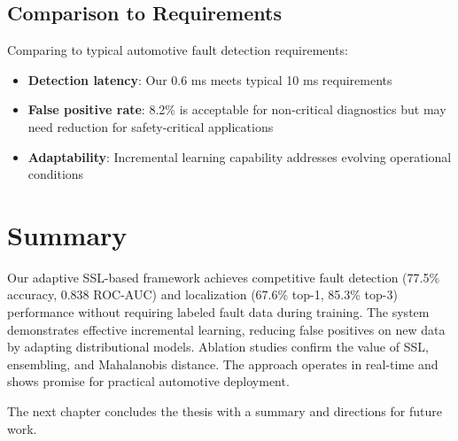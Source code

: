 \subsection{Comparison to Requirements}

Comparing to typical automotive fault detection requirements:
\begin{itemize}
    \item \textbf{Detection latency}: Our 0.6 ms meets typical 10 ms requirements
    \item \textbf{False positive rate}: 8.2\% is acceptable for non-critical diagnostics but may need reduction for safety-critical applications
    \item \textbf{Adaptability}: Incremental learning capability addresses evolving operational conditions
\end{itemize}

\section{Summary}

Our adaptive SSL-based framework achieves competitive fault detection (77.5\% accuracy, 0.838 ROC-AUC) and localization (67.6\% top-1, 85.3\% top-3) performance without requiring labeled fault data during training. The system demonstrates effective incremental learning, reducing false positives on new data by adapting distributional models. Ablation studies confirm the value of SSL, ensembling, and Mahalanobis distance. The approach operates in real-time and shows promise for practical automotive deployment.

The next chapter concludes the thesis with a summary and directions for future work.
